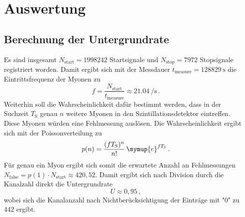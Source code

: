 \section{Auswertung}
\label{sec:Auswertung}

\subsection{Berechnung der Untergrundrate}
\label{sec:unter}
Es sind insgesamt $N_\text{start}=1998242$ Startsignale und 
$N_\text{stop}=7972$ Stopsignale registriert worden.
Damit ergibt sich mit der Messdauer $t_\text{measure}=\SI{128829}{\second}$
die Eintrittsfrequenz der Myonen zu
\begin{equation*}
	f = \frac{N_\text{start}}{t_\text{measure}} \approx \SI{21,04}{\per\second} \, \text{.}
\end{equation*}
Weiterhin soll die Wahrscheinlichkeit dafür bestimmt werden, dass in der 
Suchzeit $T_\text{S}$ genau $n$ weitere Myonen in den Szintillationsdetektor
eintreffen. Diese Myonen würden eine Fehlmessung auslösen. Die Wahrscheinlichkeit ergibt sich mit der Poissonverteilung zu
\begin{equation*}
	p(n)=\frac{(f T_\text{S})^n}{n!} \, \symup{e}^{f T_\text{S}} \, \text{.}
\end{equation*}
Für genau ein Myon ergibt sich somit die erwartete Anzahl an Fehlmessungen 
$N_\text{false}=p(1) \cdot N_\text{start} \approx 420,52$. Damit ergibt sich
nach Division durch die Kanalzahl direkt die Untergrundrate 
\begin{equation*}
	U \approx 0,95 \, \mathrm{,}
\end{equation*}
wobei sich die Kanalanzahl nach Nichtberücksichtigung der Einträge mit "$0$" zu $442$ ergibt.
